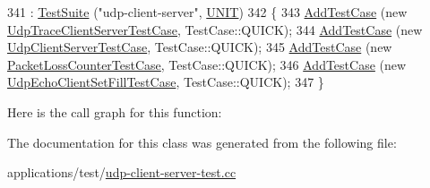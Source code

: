 \begin{DoxyCode}
341   : \hyperlink{classns3_1_1TestSuite_a904b0c40583b744d30908aeb94636d1a}{TestSuite} (\textcolor{stringliteral}{"udp-client-server"}, \hyperlink{classns3_1_1TestSuite_a1ebfcab34ec8161e085e8e3a1855eae0a3885375a3787abf60431f8454b3cadbd}{UNIT})
342 \{
343   \hyperlink{classns3_1_1TestCase_a3718088e3eefd5d6454569d2e0ddd835}{AddTestCase} (\textcolor{keyword}{new} \hyperlink{classUdpTraceClientServerTestCase}{UdpTraceClientServerTestCase}, TestCase::QUICK);
344   \hyperlink{classns3_1_1TestCase_a3718088e3eefd5d6454569d2e0ddd835}{AddTestCase} (\textcolor{keyword}{new} \hyperlink{classUdpClientServerTestCase}{UdpClientServerTestCase}, TestCase::QUICK);
345   \hyperlink{classns3_1_1TestCase_a3718088e3eefd5d6454569d2e0ddd835}{AddTestCase} (\textcolor{keyword}{new} \hyperlink{classPacketLossCounterTestCase}{PacketLossCounterTestCase}, TestCase::QUICK);
346   \hyperlink{classns3_1_1TestCase_a3718088e3eefd5d6454569d2e0ddd835}{AddTestCase} (\textcolor{keyword}{new} \hyperlink{classUdpEchoClientSetFillTestCase}{UdpEchoClientSetFillTestCase}, TestCase::QUICK);
347 \}
\end{DoxyCode}


Here is the call graph for this function\+:




The documentation for this class was generated from the following file\+:\begin{DoxyCompactItemize}
\item 
applications/test/\hyperlink{udp-client-server-test_8cc}{udp-\/client-\/server-\/test.\+cc}\end{DoxyCompactItemize}
